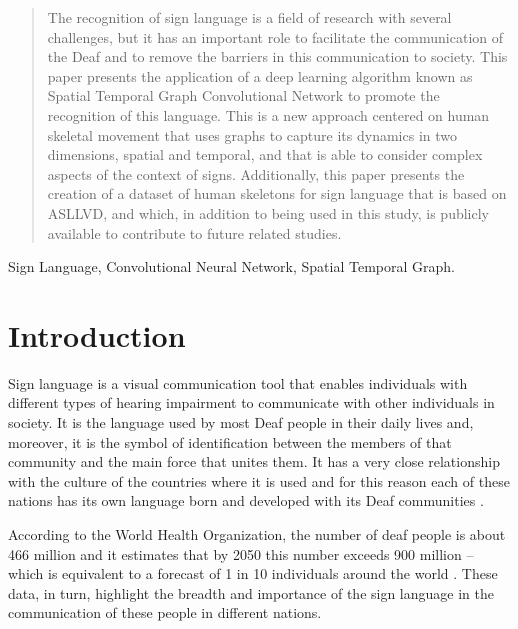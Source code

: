 


\maketitle

\begin{abstract}
The recognition of sign language is a field of research with several challenges, but it has an important role to facilitate the communication of the Deaf and to remove the barriers in this communication to society. This paper presents the application of a deep learning algorithm known as Spatial Temporal Graph Convolutional Network to promote the recognition of this language. This is a new approach centered on human skeletal movement that uses graphs to capture its dynamics in two dimensions, spatial and temporal, and that is able to consider complex aspects of the context of signs. Additionally, this paper presents the creation of a dataset of human skeletons for sign language that is based on ASLLVD, and which, in addition to being used in this study, is publicly available to contribute to future related studies.
\end{abstract}

\begin{IEEEkeywords}
Sign Language, Convolutional Neural Network, Spatial Temporal Graph.
\end{IEEEkeywords}


\section{Introduction} 
\label{sec:introducao}

Sign language is a visual communication tool that enables individuals with different types of hearing impairment to communicate with other individuals in society. It is the language used by most Deaf people in their daily lives and, moreover, it is the symbol of identification between the members of that community and the main force that unites them.  It has a very close relationship with the culture of the countries where it is used and for this reason each of these nations has its own language born and developed with its Deaf communities \cite{pereira-choi-2011}.

According to the World Health Organization, the number of deaf people is about 466 million and it estimates that by 2050 this number exceeds 900 million -- which is equivalent to a forecast of 1 in 10 individuals around the world \cite{who-2018}. These data, in turn, highlight the breadth and importance of the sign language in the communication of these people in different nations.

